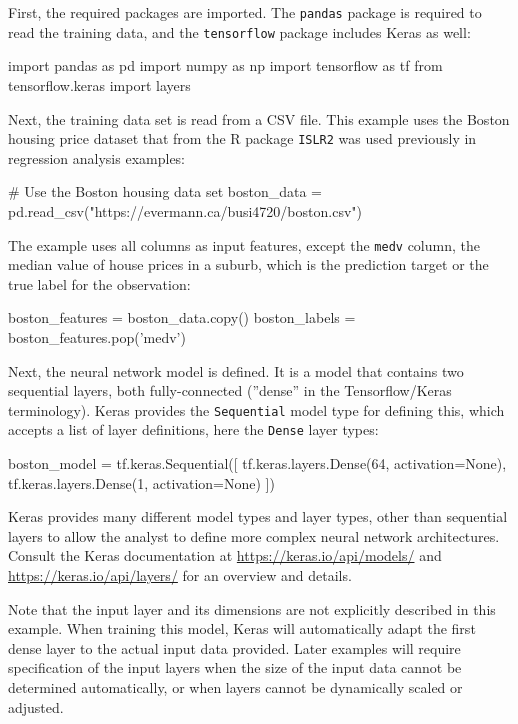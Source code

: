 First, the required packages are imported. The \texttt{pandas} package is required to read the training data, and the \texttt{tensorflow} package includes Keras as well:

\begin{pythoncode}
import pandas as pd
import numpy as np
import tensorflow as tf
from tensorflow.keras import layers
\end{pythoncode}

Next, the training data set is read from a CSV file. This example uses the Boston housing price dataset that from the R package \texttt{ISLR2} was used previously in regression analysis examples:

\begin{pythoncode}
# Use the Boston housing data set
boston_data = pd.read_csv("https://evermann.ca/busi4720/boston.csv")
\end{pythoncode}

The example uses all columns as input features, except the \texttt{medv} column, the median value of house prices in a suburb, which is the prediction target or the true label for the observation:

\begin{pythoncode}
boston_features = boston_data.copy()
boston_labels = boston_features.pop('medv')
\end{pythoncode}

Next, the neural network model is defined. It is a model that contains two sequential layers, both fully-connected (''dense'' in the Tensorflow/Keras terminology). Keras provides the \texttt{Sequential} model type for defining this, which accepts a list of layer definitions, here the \texttt{Dense} layer types:

\begin{pythoncode}
boston_model = tf.keras.Sequential([
  tf.keras.layers.Dense(64, activation=None),
  tf.keras.layers.Dense(1, activation=None)
])
\end{pythoncode}

Keras provides many different model types and layer types, other than sequential layers to allow the analyst to define more complex neural network architectures. Consult the Keras documentation at \url{https://keras.io/api/models/} and \url{https://keras.io/api/layers/} for an overview and details.

Note that the input layer and its dimensions are not explicitly described in this example. When training this model, Keras will automatically adapt the first dense layer to the actual input data provided. Later examples will require specification of the input layers when the size of the input data cannot be determined automatically, or when layers cannot be dynamically scaled or adjusted. 

